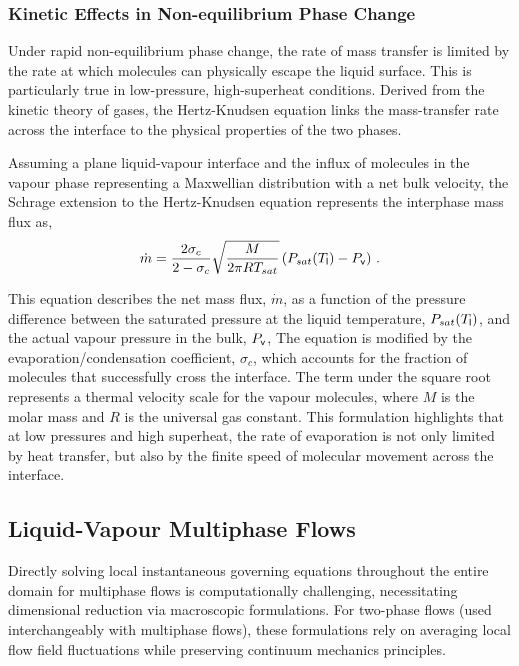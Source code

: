 \subsubsection*{Kinetic Effects in Non-equilibrium Phase Change}\par\vspace{-\baselineskip}\vspace{\parskip}
Under rapid non-equilibrium phase change, the rate of mass transfer is limited by the 
rate at which molecules can physically escape the liquid surface. This is particularly true
in low-pressure, high-superheat conditions. Derived from the kinetic theory of gases,
the Hertz-Knudsen equation links the mass-transfer rate across the interface to the 
physical properties of the two phases. 

Assuming a plane liquid-vapour interface and the influx of molecules in the vapour phase
 representing a Maxwellian distribution with a net bulk velocity, the Schrage extension
 to the Hertz-Knudsen equation represents the interphase mass flux as, 
\begin{equation}
\dot{m} = \frac{2\sigma_c}{2-\sigma_c} \sqrt{\frac{M}{2 \pi R T_{sat}}} \left(P_{sat}(T_{\mathsf {l}}) - P_{\mathsf {v}}\right)\,.
\end{equation}

This equation describes the net mass flux, $\dot{m}$, as a function of the 
pressure difference between the saturated pressure at the 
liquid temperature, $P_{sat}(T_{\mathsf {l}})$, and the actual vapour pressure 
in the bulk, $P_{\mathsf {v}}$, The equation is modified by the evaporation/condensation 
coefficient, $\sigma_c$, which accounts for the fraction of molecules that successfully 
cross the interface. The term under the square root represents a 
thermal velocity scale for the vapour molecules,
 where $M$ is the molar mass and $R$ is the universal gas 
 constant. This formulation highlights that at low pressures and high superheat, 
 the rate of evaporation is not only limited by heat transfer, 
 but also by the finite speed of molecular movement across the interface.
\subsection{Liquid-Vapour Multiphase Flows}
Directly solving local instantaneous governing equations throughout 
the entire domain for multiphase flows is computationally challenging, necessitating 
dimensional reduction via macroscopic formulations. For two-phase flows 
(used interchangeably with multiphase flows), these formulations rely on averaging local flow field 
fluctuations while preserving continuum mechanics principles. %

